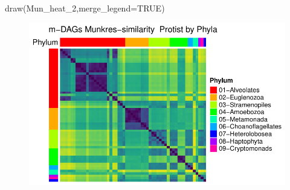 \documentclass[
  letterpaper,
  DIV=11,
  numbers=noendperiod]{scrreprt}
\newenvironment{Shaded}{}{}
\newcommand{\AttributeTok}[1]{\textcolor[rgb]{0.78,0.47,0.87}{#1}}
\newcommand{\ConstantTok}[1]{\textcolor[rgb]{0.82,0.60,0.40}{#1}}
\newcommand{\FunctionTok}[1]{\textcolor[rgb]{0.38,0.69,0.94}{#1}}
\newcommand{\NormalTok}[1]{\textcolor[rgb]{0.67,0.70,0.75}{#1}}
\begin{document}
\begin{Shaded}
\begin{Highlighting}[]
\FunctionTok{draw}\NormalTok{(Mun\_heat\_2,}\AttributeTok{merge\_legend=}\ConstantTok{TRUE}\NormalTok{)}
\end{Highlighting}
\end{Shaded}

\begin{figure}[H]

{\centering \includegraphics[width=1\textwidth,height=\textheight]{appendix_files/figure-pdf/unnamed-chunk-16-2.pdf}

}

\end{figure}
\end{document}
